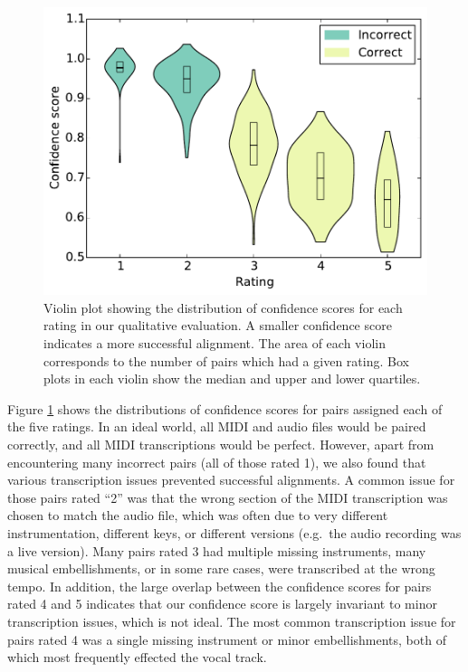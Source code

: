 \documentclass{article}
\begin{document}
\begin{figure}[t]
  \centering
  \includegraphics[width=\columnwidth]{violin.pdf}
  \caption{Violin plot showing the distribution of confidence scores for each rating in our qualitative evaluation.
A smaller confidence score indicates a more successful alignment.
The area of each violin corresponds to the number of pairs which had a given rating.
Box plots in each violin show the median and upper and lower quartiles.}
  \label{fig:violin}
\end{figure}

Figure \ref{fig:violin} shows the distributions of confidence scores for pairs assigned each of the five ratings.
In an ideal world, all MIDI and audio files would be paired correctly, and all MIDI transcriptions would be perfect.
However, apart from encountering many incorrect pairs (all of those rated 1), we also found that various transcription issues prevented successful alignments.
A common issue for those pairs rated ``2'' was that the wrong section of the MIDI transcription was chosen to match the audio file, which was often due to very different instrumentation, different keys, or different versions (e.g.\ the audio recording was a live version).
Many pairs rated 3 had multiple missing instruments, many musical embellishments, or in some rare cases, were transcribed at the wrong tempo.
In addition, the large overlap between the confidence scores for pairs rated 4 and 5 indicates that our confidence score is largely invariant to minor transcription issues, which is not ideal.
The most common transcription issue for pairs rated 4 was a single missing instrument or minor embellishments, both of which most frequently effected the vocal track.
\end{document}
